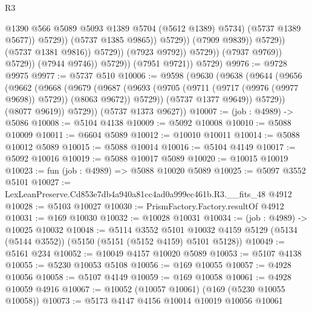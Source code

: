 \begin{lexlean}{R3}
\begin{coremodule}
                                                    @1390
                                                    @566
                                                    @5089
                                                    @5093
                                                    @1389
                                                    @5704
                                                    (@5612 @1389)
                                                    @5734)
                                                  (@5737 @1389 @5677))
                                                @5729))
                                            (@5737 @1385 @9865))
                                          @5729))
                                      (@7909 @9839))
                                    @5729))
                                (@5737 @1381 @9816))
                              @5729))
                          (@7923 @9792))
                        @5729))
                    (@7937 @9769))
                  @5729))
              (@7944 @9746))
            @5729))
        (@7951 @9721))
      @5729)
@9976 := @9728 @9975
@9977 := @5737 @510
@10006 := @9598
    (@9630
      (@9638
        (@9644
          (@9656
            (@9662
              (@9668
                (@9679
                  (@9687
                    (@9693 (@9705 (@9711 (@9717 (@9976 (@9977 @9698)) @5729)) (@8063 @9672)) @5729))
                  (@5737 @1377 @9649))
                @5729))
            (@8077 @9619))
          @5729))
      (@5737 @1373 @9627))
@10007 := (job : @4989) -> @5086
@10008 := @5104 @4138
@10009 := @5092 @10008
@10010 := @5088 @10009
@10011 := @6604 @5089
@10012 := @10010 @10011
@10014 := @5088 @10012 @5089
@10015 := @5088 @10014
@10016 := @5104 @4149
@10017 := @5092 @10016
@10019 := @5088 @10017 @5089
@10020 := @10015 @10019
@10023 := fun (job : @4989) => @5088 @10020 @5089
@10025 := @5097 @3552 @5101
@10027 := LexLeanPreserve.Cd853e7db4a940a81cc4ad0a999ec461b.R3.__fits_48 @4912
@10028 := @5103 @10027
@10030 := PrismFactory.Factory.resultOf @4912
@10031 := @169 @10030
@10032 := @10028 @10031
@10034 := (job : @4989) -> @10025 @10032
@10048 := @5114
    @3552
    @5101
    @10032
    @4159
    @5129
    (@5134 (@5144 @3552))
    (@5150 (@5151 (@5152 @4159) @5101 @5128))
@10049 := @5161 @234
@10052 := @10049 @4157 @10020 @5089
@10053 := @5107 @4138
@10055 := @5230 @10053 @5108
@10056 := @169 @10055
@10057 := @4928 @10056
@10058 := @5107 @4149
@10059 := @169 @10058
@10061 := @4928 @10059 @4916
@10067 := @10052 (@10057 @10061) (@169 (@5230 @10055 @10058))
@10073 := @5173 @4147 @4156 @10014 @10019 @10056 @10061

\end{coremodule}
\end{lexlean}
